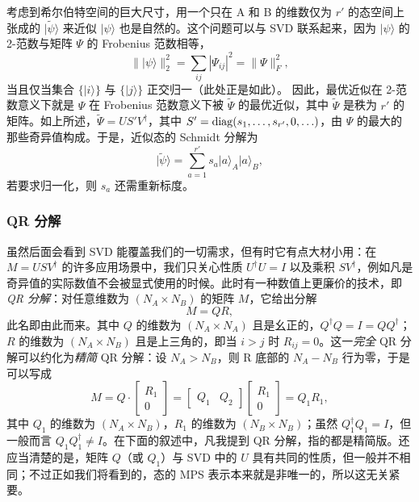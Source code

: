\documentclass[a4paper,10pt,oneside,onecolumn,1p,times]{elsarticle}
\newcommand{\ket}[1]{\mbox{$| #1  \rangle$}}
\begin{document}
考虑到希尔伯特空间的巨大尺寸，用一个只在 A 和 B 的维数仅为 $r'$ 的态空间上张成的 $\ket{\tilde{\psi}}$ 来近似 $\ket{\psi}$ 也是自然的。这个问题可以与 SVD 联系起来，因为 $\ket{\psi}$ 的 2-范数与矩阵 $\Psi$ 的 Frobenius 范数相等，
\begin{equation}
\| \ket{\psi} \|_2^2 = \sum_{ij} | \Psi_{ij} |^2 = \| \Psi \|_F^2 ,
\end{equation}
当且仅当集合 $\{ \ket{i} \}$ 与 $\{ \ket{j} \}$ 正交归一（此处正是如此）。
因此，最优近似在 2-范数意义下就是 $\Psi$ 在 Frobenius 范数意义下被 $\tilde{\Psi}$ 的最优近似，其中 $\tilde{\Psi}$ 是秩为 $r'$ 的矩阵。如上所述，$\tilde{\Psi} = US' V^\dagger$，其中 $S'={\rm diag}(s_1, \ldots, s_{r'}, 0, \ldots)$，由 $\Psi$ 的最大的那些奇异值构成。于是，近似态的 Schmidt 分解为
\begin{equation}
\ket{\tilde{\psi}} = \sum_{a=1}^{r'} s_a \ket{a}_A \ket{a}_B ,
\label{eq:Schmidtapproximation}
\end{equation}
若要求归一化，则 $s_a$ 还需重新标度。

\subsubsection{QR 分解}
虽然后面会看到 SVD 能覆盖我们的一切需求，但有时它有点大材小用：在 $M=USV^\dagger$ 的许多应用场景中，我们只关心性质 $U^\dagger U = I$ 以及乘积 $SV^\dagger$，例如凡是奇异值的实际数值不会被显式使用的时候。此时有一种数值上更廉价的技术，即 {\em QR 分解}：对任意维数为 $(N_A \times N_B)$ 的矩阵 $M$，它给出分解
\begin{equation}
M = QR ,
\label{eq:QRdecomposition}
\end{equation}
此名即由此而来。其中 $Q$ 的维数为 $(N_A \times N_A)$ 且是幺正的，$Q^\dagger Q = I = Q Q^\dagger$；$R$ 的维数为 $(N_A \times N_B)$ 且是上三角的，即当 $i>j$ 时 $R_{ij}=0$。这一{\em 完全} QR 分解可以约化为{\em 精简} QR 分解：设 $N_A > N_B$，则 R 底部的 $N_A-N_B$ 行为零，于是可以写成
\begin{equation}
M=Q \cdot \left[ \begin{array}{c} R_1 \\ 0 \end{array} \right] = \left[ \begin{array}{cc} Q_1 & Q_2 \end{array} \right] \left[ \begin{array}{c} R_1 \\ 0 \end{array} \right] = Q_1 R_1 ,
\label{eq:thinQRdecomposition}
\end{equation}
其中 $Q_1$ 的维数为 $(N_A \times N_B)$，$R_1$ 的维数为 $(N_B \times N_B)$；虽然 $Q_1^\dagger Q_1 = I$，但一般而言 $Q_1 Q_1^\dagger \neq I$。在下面的叙述中，凡我提到 QR 分解，指的都是精简版。还应当清楚的是，矩阵 $Q$（或 $Q_1$）与 SVD 中的 $U$ 具有共同的性质，但一般并不相同；不过正如我们将看到的，态的 MPS 表示本来就是非唯一的，所以这无关紧要。
\end{document}
